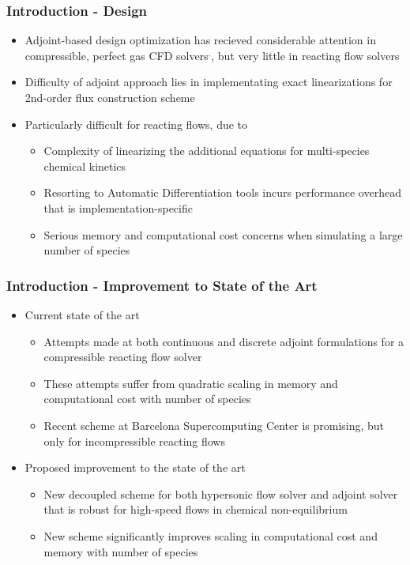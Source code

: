 \documentclass{beamer}
\begin{document}
\begin{frame}
  \frametitle{Introduction - Design}
  \begin{itemize}
    \item Adjoint-based design optimization has recieved considerable attention
      in compressible, perfect gas CFD
      solvers$^,$, but very little in
      reacting flow solvers
    \item Difficulty of adjoint approach lies in implementating exact
      linearizations for 2nd-order flux construction scheme
    \item Particularly difficult for reacting flows, due to 
      \begin{itemize}
        \item Complexity of linearizing the additional equations for
          multi-species chemical kinetics
        \item Resorting to Automatic Differentiation tools incurs performance
          overhead that is implementation-specific
        \item Serious memory and computational cost concerns when simulating a
          large number of species
      \end{itemize}
  \end{itemize}
\end{frame}
\begin{frame}
  \frametitle{Introduction - Improvement to State of the Art}
  \begin{itemize}
    \item Current state of the art
      \begin{itemize}
        \item Attempts made at both continuous and
          discrete adjoint formulations
          for a compressible reacting flow solver
        \item These attempts suffer from quadratic scaling in memory and
          computational cost with number of species
        \item Recent scheme at Barcelona Supercomputing
          Center is promising, but only for
          incompressible reacting flows
      \end{itemize}
    \item Proposed improvement to the state of the art
      \begin{itemize}
        \item New decoupled scheme for both hypersonic flow solver and adjoint
          solver that is robust for high-speed flows in chemical non-equilibrium
        \item New scheme significantly improves scaling in computational cost and
          memory with number of species
      \end{itemize}
  \end{itemize}
\end{frame}
\end{document}
